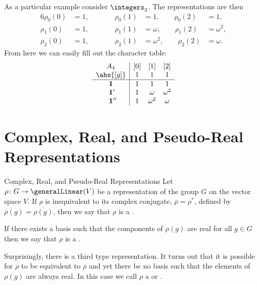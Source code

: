 As a particular example consider \(\integers_3\).
The representations are then
\begin{alignat}{6}
    \rho_0(0) &= 1, \qquad && \rho_0(1) &= 1, \qquad \rho_0(2) &= 1,\\
    \rho_1(0) &= 1, \qquad && \rho_1(1) &= \omega, \qquad \rho_1(2) &= \omega^2,\\
    \rho_2(0) &= 1, \qquad && \rho_2(1) &= \omega^2, \qquad \rho_2(2) &= \omega.
\end{alignat}
From here we can easily fill out the character table:
\begin{equation}
    \begin{array}{c|ccc}
        A_4 & [0] & [1] & [2] \\
        \abs{[g]} & 1 & 1 & 1 \\ \hline
        \rep{1} & 1 & 1 & 1 \\
        \rep{1}\mathrlap{'} & 1 & \omega & \omega^2 \\
        \rep{1}\mathrlap{''} & 1 & \omega^2 &  \omega
    \end{array}
\end{equation}

\section{Complex, Real, and Pseudo-Real Representations}
\begin{dfn}{Complex, Real, and Pseudo-Real Representations}{}
    Let \(\rho \colon G \to \generalLinear(V)\) be a representation of the
    group \(G\) on the vector space \(V\).
    If \(\rho\) is inequivalent to its complex conjugate, \(\overline{\rho}
    = \rho^*\), defined by \(\overline{\rho}(g) = \overline{\rho(g)}\), then we say
    that \(\rho\) is a .
    
    If there exists a basis such that the components of \(\rho(g)\) are real
    for all \(g \in G\) then we say that \(\rho\) is a .
    
    Surprisingly, there is a third type representation.
    It turns out that it is possible for \(\rho\) to be equivalent to
    \(\overline{\rho}\) and yet there be no basis such that the elements of
    \(\rho(g)\) are always real.
    In this case we call \(\rho\) a 
    or .
\end{dfn}

